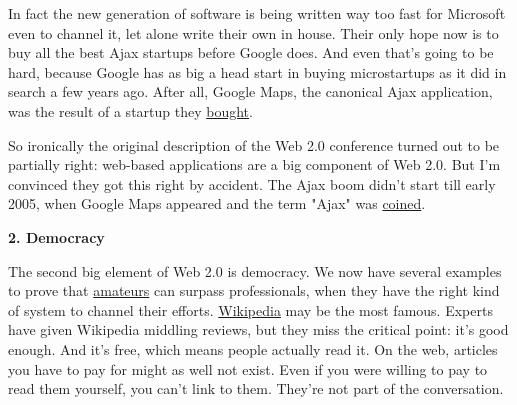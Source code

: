In fact the new
                    generation of software is being written way too fast for
                    Microsoft even to channel it, let alone write their own in
                    house. Their only hope now is to buy all the best Ajax
                    startups before Google does. And even that's going to be
                    hard, because Google has as big a head start in buying
                    microstartups as it did in search a few years ago. After
                    all, Google Maps, the canonical Ajax application, was the
                    result of a startup they
                    \href{http://googlemapsmania.blogspot.com/2005/10/google-maps-lead-engineer-gaze
s-into.html}{bought}.

So ironically the original description of the
                    Web 2.0 conference turned out to be partially right:
                    web-based applications are a big component of Web 2.0. But
                    I'm convinced they got this right by accident. The Ajax boom
                    didn't start till early 2005, when Google Maps appeared and
                    the term "Ajax" was
                    \href{http://www.adaptivepath.com/publications/essays/archives/000385.php}{coined}.

\textbf{2. Democracy}

The second big
                    element of Web 2.0 is democracy. We now have several
                    examples to prove that
                    \href{http://www.paulgraham.com/opensource.html}{amateurs} can surpass
                    professionals, when they have the right kind of system to
                    channel their efforts.
                    \href{http://wikipedia.org}{Wikipedia} may be the most
                    famous. Experts have given Wikipedia middling reviews, but
                    they miss the critical point: it's good enough. And it's
                    free, which means people actually read it. On the web,
                    articles you have to pay for might as well not exist. Even
                    if you were willing to pay to read them yourself, you can't
                    link to them. They're not part of the conversation.

